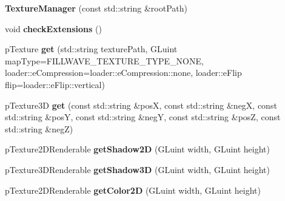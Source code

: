 \begin{DoxyCompactItemize}
\item 
\hypertarget{classfillwave_1_1manager_1_1TextureManager_a78507f2a56fb12e6731214b4188e0f46}{}{\bfseries Texture\+Manager} (const std\+::string \&root\+Path)\label{classfillwave_1_1manager_1_1TextureManager_a78507f2a56fb12e6731214b4188e0f46}

\item 
\hypertarget{classfillwave_1_1manager_1_1TextureManager_afe697291c20e99f65f9d186c8f5926eb}{}void {\bfseries check\+Extensions} ()\label{classfillwave_1_1manager_1_1TextureManager_afe697291c20e99f65f9d186c8f5926eb}

\item 
\hypertarget{classfillwave_1_1manager_1_1TextureManager_a11ea80fe4e38daa0c2d04a6c2f46c62a}{}p\+Texture {\bfseries get} (std\+::string texture\+Path, G\+Luint map\+Type=F\+I\+L\+L\+W\+A\+V\+E\+\_\+\+T\+E\+X\+T\+U\+R\+E\+\_\+\+T\+Y\+P\+E\+\_\+\+N\+O\+N\+E, loader\+::e\+Compression=loader\+::e\+Compression\+::none, loader\+::e\+Flip flip=loader\+::e\+Flip\+::vertical)\label{classfillwave_1_1manager_1_1TextureManager_a11ea80fe4e38daa0c2d04a6c2f46c62a}

\item 
\hypertarget{classfillwave_1_1manager_1_1TextureManager_a9976210f8b5ee16462f1b858b3936296}{}p\+Texture3\+D {\bfseries get} (const std\+::string \&pos\+X, const std\+::string \&neg\+X, const std\+::string \&pos\+Y, const std\+::string \&neg\+Y, const std\+::string \&pos\+Z, const std\+::string \&neg\+Z)\label{classfillwave_1_1manager_1_1TextureManager_a9976210f8b5ee16462f1b858b3936296}

\item 
\hypertarget{classfillwave_1_1manager_1_1TextureManager_aefa1fff947dcf90934855dd2dd1daa41}{}p\+Texture2\+D\+Renderable {\bfseries get\+Shadow2\+D} (G\+Luint width, G\+Luint height)\label{classfillwave_1_1manager_1_1TextureManager_aefa1fff947dcf90934855dd2dd1daa41}

\item 
\hypertarget{classfillwave_1_1manager_1_1TextureManager_acebae6c67d9ed5d26b0326a14cc536ea}{}p\+Texture3\+D\+Renderable {\bfseries get\+Shadow3\+D} (G\+Luint width, G\+Luint height)\label{classfillwave_1_1manager_1_1TextureManager_acebae6c67d9ed5d26b0326a14cc536ea}

\item 
\hypertarget{classfillwave_1_1manager_1_1TextureManager_a310720a772e2c3d2bd1d6afe1252e820}{}p\+Texture2\+D\+Renderable {\bfseries get\+Color2\+D} (G\+Luint width, G\+Luint height)\label{classfillwave_1_1manager_1_1TextureManager_a310720a772e2c3d2bd1d6afe1252e820}


\end{DoxyCompactItemize}
